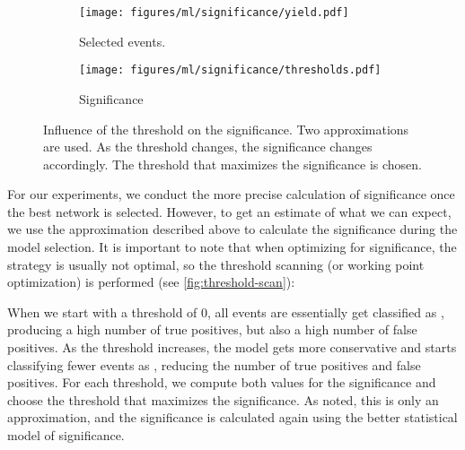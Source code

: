 \begin{figure}[htb]
    \centering
    \begin{subfigure}[t]{0.47\textwidth}
        \texttt{[image: figures/ml/significance/yield.pdf]}
        \caption{Selected events.}
        \label{fig:signal-yield}
    \end{subfigure}
    \begin{subfigure}[t]{0.47\textwidth}
        \texttt{[image: figures/ml/significance/thresholds.pdf]}
        \caption{Significance}
        \label{fig:threshold-scan}
    \end{subfigure}
    \hfill
    \caption[Influence of the threshold on the significance]
    {Influence of the threshold on the significance. Two approximations are used. As the threshold changes, the
        significance changes accordingly. The threshold that maximizes the significance is chosen.}
    \label{fig:significance-optimization}
\end{figure}

For our experiments, we conduct the more precise calculation of significance once the best network is selected. However,
to get an estimate of what we can expect, we use the approximation described above to calculate the significance during
the model selection. It is important to note that when optimizing for significance, the \argmax strategy is usually not
optimal, so the threshold scanning (or working point optimization) is performed (see \autoref{fig:threshold-scan}):


When we start with a threshold of 0, all events are essentially get classified as \tth, producing a high number of true
positives, but also a high number of false positives. As the threshold increases, the model gets more conservative and
starts classifying fewer events as \tth, reducing the number of true positives and false positives. For each threshold,
we compute both values for the significance and choose the threshold that maximizes the significance. As noted, this
is only an approximation, and the significance is calculated again using the better statistical model of significance.